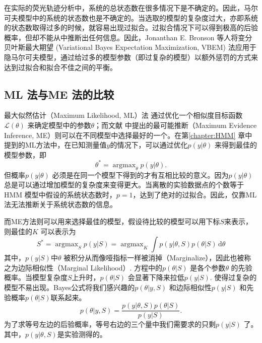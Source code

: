 \documentclass[11pt, a4paper]{article}
\DeclareMathOperator*{\argmax}{argmax}
\begin{document}
    在实际的荧光轨迹分析中，系统的总状态数在很多情况下是不确定的。因此，马尔可夫模型中的系统的状态数也是不确定的。当选取的模型的复杂度过大，亦即系统的状态数取得过多的时候，就容易出现过拟合。过拟合情况下可以得到极高的后验概率，但却不能从中推断出任何信息。因此，Jonanthan E. Bronson 等人将变分贝叶斯最大期望 (Variational Bayes Expectation Maximization, VBEM) 法应用于隐马尔可夫模型\cite{VBEM}，通过给过多的模型参数（即过复杂的模型）以额外惩罚的方式来达到过拟合和拟合不佳之间的平衡。

    \subsection{ML 法与ME 法的比较}
    最大似然估计（Maximum Likelihood, ML）法\cite{wiki:mle} 通过优化一个相似度目标函数$\mathcal L(\theta)$ 来确定模型中的参数$\theta$；而文献\cite{VBEM} 中提出的最可能推断（Maximum Evidence Inference, ME）则可以在不同模型中选择最好的一个。在第\ref{chapter:HMM} 章中提到的ML方法中，在已知测量值$y$的情况下，可以通过优化$p(y|\theta)$ 来得到最佳的模型参数，即
    \begin{equation}\label{eqn:ML_estimate}
      \theta^* = \argmax_\theta p(y| \theta).
    \end{equation}
    但概率$p(y|\theta)$ 必须是在同一个模型下得到的才有互相比较的意义。因为$p(y|\theta)$ 总是可以通过增加模型的复杂度来变得更大。当离散的实验数据点的个数等于HMM 模型中假设的系统状态数时，$p=1$，达到了绝对的过拟合。因此，仅靠ML 法无法推断关于系统状态数的信息。

    而ME方法则可以用来选择最佳的模型，假设待比较的模型可以用下标$S$来表示，则最佳的$K$ 可以表示为
    \begin{equation}\label{eqn:ME_model}
      S^* = \argmax_S p(y| S) = \argmax_K \int p(y| \theta, S)p(\theta| S)\,\mathrm d\theta
    \end{equation}
    其中，$p(y| S)$中$\theta$ 被积分从而像哑指标一样被消掉（Marginalize），因此也被称之为边际相似性（Marginal Likelihood）. 方程中的$p(\theta | S)$ 是各个参数$\theta$ 的先验概率。当模型复杂度$S$上升时，$p(\theta | S)$ 会显著下降来拉低$p(y| S)$. 使得过复杂的模型不易出现。Bayes公式将我们感兴趣的$p(\theta|y,S)$ 和边际相似性$p(y|S)$ 和先验概率$p(\theta|S)$联系起来。
    \begin{equation}\label{eqn:bayes_vbem}
      p(\theta| y, S) = \frac{p(y| \theta, S)p(\theta| S)}{p(y| S)}.
    \end{equation}
    为了求等号左边的后验概率，等号右边的三个量中我们需要求的只剩$p(y| S)$ 了。其中，$p(y| \theta, S)$是实验测得的。
\end{document}
